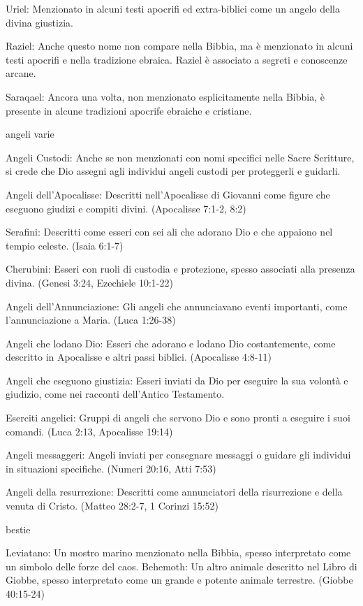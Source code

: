 \documentclass[a4paper,twoside,openany]{book}
\begin{document}
Uriel: Menzionato in alcuni testi apocrifi ed extra-biblici come un angelo della divina giustizia.

Raziel: Anche questo nome non compare nella Bibbia, ma è menzionato in alcuni testi apocrifi e nella tradizione ebraica. Raziel è associato a segreti e conoscenze arcane.


Saraqael: Ancora una volta, non menzionato esplicitamente nella Bibbia, è presente in alcune tradizioni apocrife ebraiche e cristiane.

angeli varie

Angeli Custodi: Anche se non menzionati con nomi specifici nelle Sacre Scritture, si crede che Dio assegni agli individui angeli custodi per proteggerli e guidarli.

Angeli dell'Apocalisse: Descritti nell'Apocalisse di Giovanni come figure che eseguono giudizi e compiti divini. (Apocalisse 7:1-2, 8:2)

Serafini: Descritti come esseri con sei ali che adorano Dio e che appaiono nel tempio celeste. (Isaia 6:1-7)

Cherubini: Esseri con ruoli di custodia e protezione, spesso associati alla presenza divina. (Genesi 3:24, Ezechiele 10:1-22)

Angeli dell'Annunciazione: Gli angeli che annunciavano eventi importanti, come l'annunciazione a Maria. (Luca 1:26-38)

Angeli che lodano Dio: Esseri che adorano e lodano Dio costantemente, come descritto in Apocalisse e altri passi biblici. (Apocalisse 4:8-11)

Angeli che eseguono giustizia: Esseri inviati da Dio per eseguire la sua volontà e giudizio, come nei racconti dell'Antico Testamento.

Eserciti angelici: Gruppi di angeli che servono Dio e sono pronti a eseguire i suoi comandi. (Luca 2:13, Apocalisse 19:14)

Angeli messaggeri: Angeli inviati per consegnare messaggi o guidare gli individui in situazioni specifiche. (Numeri 20:16, Atti 7:53)

Angeli della resurrezione: Descritti come annunciatori della risurrezione e della venuta di Cristo. (Matteo 28:2-7, 1 Corinzi 15:52)

bestie


Leviatano: Un mostro marino menzionato nella Bibbia, spesso interpretato come un simbolo delle forze del caos.
Behemoth: Un altro animale descritto nel Libro di Giobbe, spesso interpretato come un grande e potente animale terrestre. (Giobbe 40:15-24)
\end{document}
